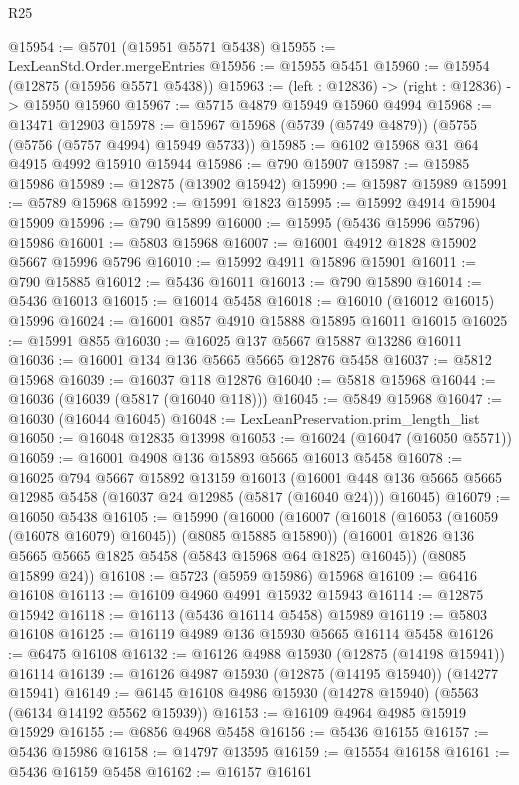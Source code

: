 \begin{lexlean}{R25}
\begin{coremodule}
@15954 := @5701 (@15951 @5571 @5438)
@15955 := LexLeanStd.Order.mergeEntries
@15956 := @15955 @5451
@15960 := @15954 (@12875 (@15956 @5571 @5438))
@15963 := (left : @12836) -> (right : @12836) -> @15950 @15960
@15967 := @5715 @4879 @15949 @15960 @4994
@15968 := @13471 @12903
@15978 := @15967 @15968 (@5739 (@5749 @4879)) (@5755 (@5756 (@5757 @4994) @15949 @5733))
@15985 := @6102 @15968 @31 @64 @4915 @4992 @15910 @15944
@15986 := @790 @15907
@15987 := @15985 @15986
@15989 := @12875 (@13902 @15942)
@15990 := @15987 @15989
@15991 := @5789 @15968
@15992 := @15991 @1823
@15995 := @15992 @4914 @15904 @15909
@15996 := @790 @15899
@16000 := @15995 (@5436 @15996 @5796) @15986
@16001 := @5803 @15968
@16007 := @16001 @4912 @1828 @15902 @5667 @15996 @5796
@16010 := @15992 @4911 @15896 @15901
@16011 := @790 @15885
@16012 := @5436 @16011
@16013 := @790 @15890
@16014 := @5436 @16013
@16015 := @16014 @5458
@16018 := @16010 (@16012 @16015) @15996
@16024 := @16001 @857 @4910 @15888 @15895 @16011 @16015
@16025 := @15991 @855
@16030 := @16025 @137 @5667 @15887 @13286 @16011
@16036 := @16001 @134 @136 @5665 @5665 @12876 @5458
@16037 := @5812 @15968
@16039 := @16037 @118 @12876
@16040 := @5818 @15968
@16044 := @16036 (@16039 (@5817 (@16040 @118)))
@16045 := @5849 @15968
@16047 := @16030 (@16044 @16045)
@16048 := LexLeanPreservation.prim_length_list
@16050 := @16048 @12835 @13998
@16053 := @16024 (@16047 (@16050 @5571))
@16059 := @16001 @4908 @136 @15893 @5665 @16013 @5458
@16078 := @16025
    @794
    @5667
    @15892
    @13159
    @16013
    (@16001 @448 @136 @5665 @5665 @12985 @5458 (@16037 @24 @12985 (@5817 (@16040 @24))) @16045)
@16079 := @16050 @5438
@16105 := @15990
    (@16000
      (@16007
        (@16018 (@16053 (@16059 (@16078 @16079) @16045)) (@8085 @15885 @15890))
        (@16001 @1826 @136 @5665 @5665 @1825 @5458 (@5843 @15968 @64 @1825) @16045))
      (@8085 @15899 @24))
@16108 := @5723 (@5959 @15986) @15968
@16109 := @6416 @16108
@16113 := @16109 @4960 @4991 @15932 @15943
@16114 := @12875 @15942
@16118 := @16113 (@5436 @16114 @5458) @15989
@16119 := @5803 @16108
@16125 := @16119 @4989 @136 @15930 @5665 @16114 @5458
@16126 := @6475 @16108
@16132 := @16126 @4988 @15930 (@12875 (@14198 @15941)) @16114
@16139 := @16126 @4987 @15930 (@12875 (@14195 @15940)) (@14277 @15941)
@16149 := @6145 @16108 @4986 @15930 (@14278 @15940) (@5563 (@6134 @14192 @5562 @15939))
@16153 := @16109 @4964 @4985 @15919 @15929
@16155 := @6856 @4968 @5458
@16156 := @5436 @16155
@16157 := @5436 @15986
@16158 := @14797 @13595
@16159 := @15554 @16158
@16161 := @5436 @16159 @5458
@16162 := @16157 @16161

\end{coremodule}
\end{lexlean}
